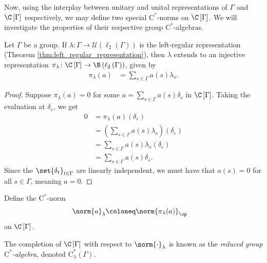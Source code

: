 Now, using the interplay between unitary and unital representations of $\Gamma$ and $\C\left[ \Gamma \right]$ respectively, we may define two special $\mathrm{C}^{\ast}$-norms on $\C\left[ \Gamma \right]$. We will investigate the properties of their respective group $\mathrm{C}^{\ast}$-algebras.
\begin{proposition}
  Let $\Gamma$ be a group. If $\lambda\colon\Gamma\rightarrow \mathcal{U}\left( \ell_2\left( \Gamma \right) \right)$ is the left-regular representation (Theorem \ref{thm:left_regular_representation}), then $\lambda$ extends to an injective representation $\pi_{\lambda}\colon \C\left[ \Gamma \right]\rightarrow \B\left( \ell_2\left( \Gamma \right) \right)$, given by
  \begin{align*}
    \pi_{\lambda}(a) &= \sum_{s\in\Gamma}a(s)\lambda_s.
  \end{align*}
\end{proposition}
\begin{proof}
  Suppose $\pi_{\lambda}(a) = 0$ for some $a = \sum_{s\in\Gamma}a(s)\delta_s$ in $\C\left[ \Gamma \right]$. Taking the evaluation at $\delta_{e}$, we get
  \begin{align*}
    0 &= \pi_{\lambda}\left( a \right)\left( \delta_e \right)\\
      &= \left( \sum_{s\in\Gamma}a(s)\lambda_s \right)\left( \delta_e \right)\\
      &= \sum_{s\in\Gamma}a(s)\lambda_s\left( \delta_e \right)\\
      &= \sum_{s\in\Gamma}a(s)\delta_s.
  \end{align*}
  Since the $\set{\delta_t}_{t\in\Gamma}$ are linearly independent, we must have that $a(s) = 0$ for all $s\in\Gamma$, meaning $a = 0$.
\end{proof}
\begin{definition}\label{def:reduced_group_cstar_algebra}
  Define the $\mathrm{C}^{\ast}$-norm
  \begin{align*}
    \norm{a}_{\lambda} &\coloneq \norm{\pi_{\lambda}(a)}_{\op}
  \end{align*}
  on $\C\left[ \Gamma \right]$.\newline

  The completion of $\C\left[ \Gamma \right]$ with respect to $\norm{\cdot}_{\lambda}$ is known as the \textit{reduced group $\mathrm{C}^{\ast}$-algebra}, denoted $\mathrm{C}^{\ast}_{\lambda}\left( \Gamma \right)$.
\end{definition}
